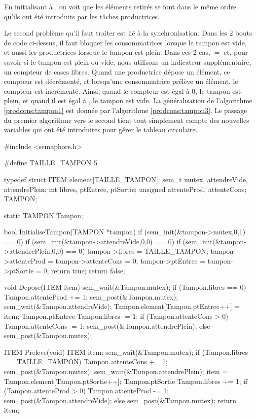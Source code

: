 En initialisant  à , on voit que les éléments retirés se font dans le même ordre qu'ils ont été introduits par les tâches productrices.

Le second problème qu'il faut traiter est lié à la synchronisation. Dans les 2 bouts de code ci-dessus, il faut bloquer les consommatrices lorsque le tampon est vide, et aussi les productrices lorsque le tampon est plein. Dans ces 2 cas,  $=$  et, pour savoir si le tampon est plein ou vide, nous utilisons un indicateur supplémentaire, un compteur de cases libres. Quand une productrice dépose un élément, ce compteur est décrémenté, et lorsqu'une consommatrice prélève un élément, le compteur est incrémenté. Ainsi, quand le compteur est égal à 0, le tampon est plein, et quand il est égal à , le tampon est vide.
La généralisation de l'algorithme \ref{prodcons:tampon1} est donnée par l'algorithme \ref{prodcons:tampon3}. Le passage du premier algorithme vers le second tient tout simplement compte des nouvelles variables qui ont été introduites pour gérer le tableau circulaire.

\begin{codeblock}[title=Algorithme de synchronisation pour un tampon, label=prodcons:tampon3]
#include <semaphore.h>

#define TAILLE_TAMPON 5

typedef struct {
  ITEM element[TAILLE_TAMPON];
  sem_t mutex, attendreVide, attendrePlein;
  int libres, ptEntree, ptSortie;
  unsigned attenteProd, attenteCons;
} TAMPON;

static TAMPON Tampon;

bool InitialiseTampon(TAMPON *tampon) {
  if (sem_init(&tampon->mutex,0,1) == 0)
     if (sem_init(&tampon->attendreVide,0,0) == 0)
        if (sem_init(&tampon->attendrePlein,0,0) == 0) {
           tampon->libres = TAILLE_TAMPON;
           tampon->attenteProd = tampon->attenteCons = 0;
           tampon->ptEntree = tampon->ptSortie = 0;
           return true;
        }
  return false;
}

void Depose(ITEM item) {
  sem_wait(&Tampon.mutex);
  if (Tampon.libres == 0) {
     Tampon.attenteProd += 1;
     sem_post(&Tampon.mutex);
     sem_wait(&Tampon.attendreVide);
  }
  Tampon.element[Tampon.ptEntree++] = item;
  Tampon.ptEntree %
  Tampon.libres -= 1;
  if (Tampon.attenteCons > 0) {
     Tampon.attenteCons -= 1;
     sem_post(&Tampon.attendrePlein);
  }
  else
     sem_post(&Tampon.mutex);
}

ITEM Preleve(void) {
  ITEM item;
  sem_wait(&Tampon.mutex);
  if (Tampon.libres == TAILLE_TAMPON) {
     Tampon.attenteCons += 1;
     sem_post(&Tampon.mutex);
     sem_wait(&Tampon.attendrePlein);
  }
  item = Tampon.element[Tampon.ptSortie++];
  Tampon.ptSortie %
  Tampon.libres += 1;
  if (Tampon.attenteProd > 0) {
     Tampon.attenteProd -= 1;
     sem_post(&Tampon.attendreVide);
  }
  else
     sem_post(&Tampon.mutex);
  return item;
}
\end{codeblock}

